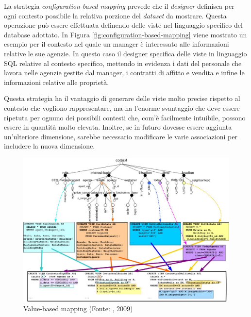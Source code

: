 La strategia \emph{configuration-based mapping} prevede che il \emph{designer} definisca per ogni contesto possibile la relativa porzione del \emph{dataset} da mostrare. Questa operazione può essere effettuata definendo delle viste nel linguaggio specifico del database adottato. In Figura \ref{fig:configuration-based-mapping} viene mostrato un esempio per il contesto nel quale un manager è interessato alle informazioni relative le sue agenzie. In questo caso il designer specifica delle viste in linguaggio SQL relative al contesto specifico, mettendo in evidenza i dati del personale che lavora nelle agenzie gestite dal manager, i contratti di affitto e vendita e infine le informazioni relative alle proprietà.

Questa strategia ha il vantaggio di generare delle viste molto precise rispetto al contesto che vogliono rappresentare, ma ha l'enorme svantaggio che deve essere ripetuta per ognuno dei possibili contesti che, com'è facilmente intuibile, possono essere in quantità molto elevata. Inoltre, se in futuro dovesse essere aggiunta un'ulteriore dimensione, sarebbe necessario modificare le varie associazioni per includere la nuova dimensione.

\begin{figure}[ht]
	\centering
	\includegraphics[width=\textwidth]{2-preliminari/Immagini/value-based-mapping.jpg}
	\caption[Value-based mapping]{Value-based mapping (Fonte: , 2009)}\label{fig:value-based-mapping}
\end{figure}

